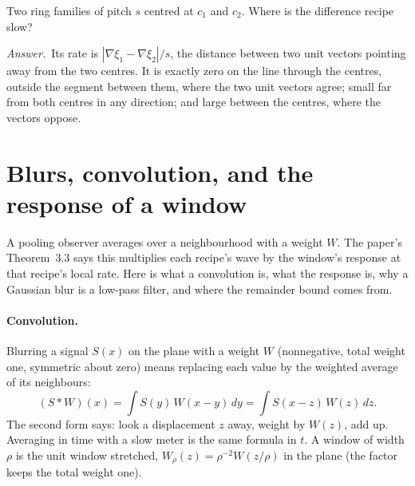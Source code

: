 \documentclass[10pt]{article}
\theoremstyle{plain}
\theoremstyle{definition}
\newcommand{\answer}{\par\smallskip\noindent\textit{Answer.}\ }
\newcommand{\cnt}{\xi}
\begin{document}
\begin{checkyourself}
Two ring families of pitch $s$ centred at $c_1$ and $c_2$. Where is the
difference recipe slow?
\answer Its rate is $|\nabla\cnt_1-\nabla\cnt_2|/s$, the distance between
two unit vectors pointing away from the two centres. It is exactly zero on
the line through the centres, outside the segment between them, where the
two unit vectors agree; small far from both centres in any direction; and
large between the centres, where the vectors oppose.
\end{checkyourself}

\section{Blurs, convolution, and the response of a window}
\label{p:blur}

\begin{why}
A pooling observer averages over a neighbourhood with a weight $W$. The
paper's Theorem~3.3 says this multiplies each recipe's wave by the window's
response at that recipe's local rate. Here is what a convolution is, what
the response is, why a Gaussian blur is a low-pass filter, and where the
remainder bound comes from.
\end{why}

\paragraph{Convolution.}
Blurring a signal $S(x)$ on the plane with a weight $W$ (nonnegative, total
weight one, symmetric about zero) means replacing each value by the
weighted average of its neighbours:
\[
  (S*W)(x)=\int S(y)\,W(x-y)\,dy=\int S(x-z)\,W(z)\,dz .
\]
The second form says: look a displacement $z$ away, weight by $W(z)$, add
up. Averaging in time with a slow meter is the same formula in $t$. A
window of width $\rho$ is the unit window stretched, $W_\rho(z)=\rho^{-2}W(z/\rho)$
in the plane (the factor keeps the total weight one).
\end{document}

